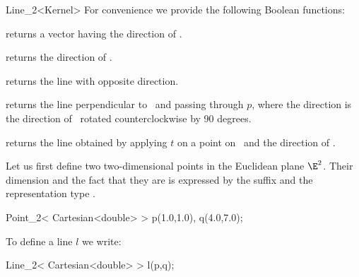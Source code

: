 \begin{ccRefClass} {Line_2<Kernel>}
For convenience we provide the following Boolean functions:

       {}
\ccGlue
{}
       {}
\ccGlue
{}
       {}


       {returns a vector having the direction of \ccVar.}

       {returns the direction of \ccVar.}

       {returns the line with opposite direction.}

        {returns the line perpendicular to \ccVar\ and passing through $p$,
         where the direction is the direction of \ccVar\ rotated 
         counterclockwise by 90 degrees.}

       {returns the line obtained by applying $t$ on a point on \ccVar\ 
        and the direction of \ccVar.}



\ccExample
Let us first define two  two-dimensional points in the Euclidean 
plane $\E^2$. Their
dimension and the fact that they are  is expressed by
the suffix \ccStyle{_2} and the representation type \ccStyle{Cartesian}.

\begin{cprog}

  Point_2< Cartesian<double> >  p(1.0,1.0), q(4.0,7.0);
\end{cprog} 

To define a line $l$ we write:

\begin{cprog}

  Line_2< Cartesian<double> > l(p,q);
\end{cprog} 

\ccSeeAlso
{} \\

\end{ccRefClass} 
